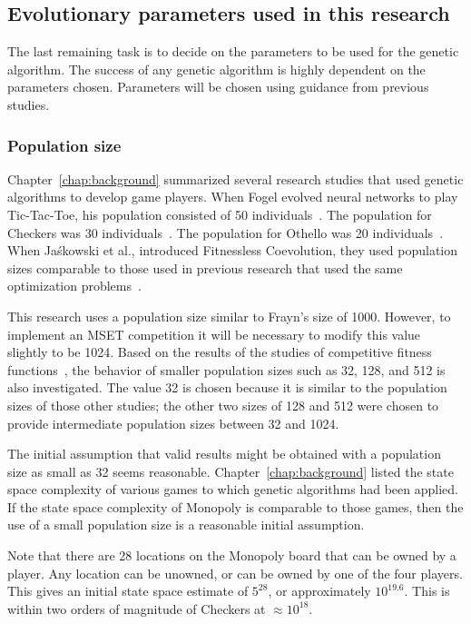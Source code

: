 \subsection{Evolutionary parameters used in this research}

The last remaining task is to decide on the parameters to be used for the
genetic algorithm. The success of any genetic algorithm is highly dependent on
the parameters chosen. Parameters will be chosen using guidance from previous
studies.

\subsubsection{Population size}

Chapter~\ref{chap:background} summarized several research studies that used
genetic algorithms to develop game players. When Fogel evolved neural networks
to play Tic-Tac-Toe, his population consisted of 50
individuals~\cite{Fogel1993}. The population for Checkers was 30
individuals~\cite{Fogel2000Anaconda,journals/tec/ChellapillaF01}.
The population for Othello was 20 individuals~\cite{ChongTW05}. When
Ja\'{s}kowski et al., introduced Fitnessless Coevolution, they used population
sizes comparable to those used in previous research that used the same
optimization problems~\cite{Jaskowski:2008:FC:1389095.1389161}.

This research uses a population size similar to Frayn's size of 1000. However,
to implement an MSET competition it will be necessary to modify this value
slightly to be 1024. Based on the results of the studies of competitive fitness
functions~\cite{Angeline:1993:CEE:645513.657590, Panait02acomparative,
Jaskowski:2008:FC:1389095.1389161}, the behavior of smaller population sizes
such as 32, 128, and 512 is also investigated. The value 32 is chosen because it
is similar to the population sizes of those other studies; the other two sizes
of 128 and 512 were chosen to provide intermediate population sizes between 32
and 1024.

The initial assumption that valid results might be obtained with a population
size as small as 32 seems reasonable. Chapter~\ref{chap:background} listed the
state space complexity of various games to which genetic algorithms had been
applied. If the state space complexity of Monopoly is comparable to those games,
then the use of a small population size is a reasonable initial assumption.

Note that there are 28 locations on the Monopoly board that can be owned by a
player. Any location can be unowned, or can be owned by one of the four players.
This gives an initial state space estimate of \(5^{28}\), or approximately
\(10^{19.6}\). This is within two orders of magnitude of Checkers at
\(\approx10^{18}\).

